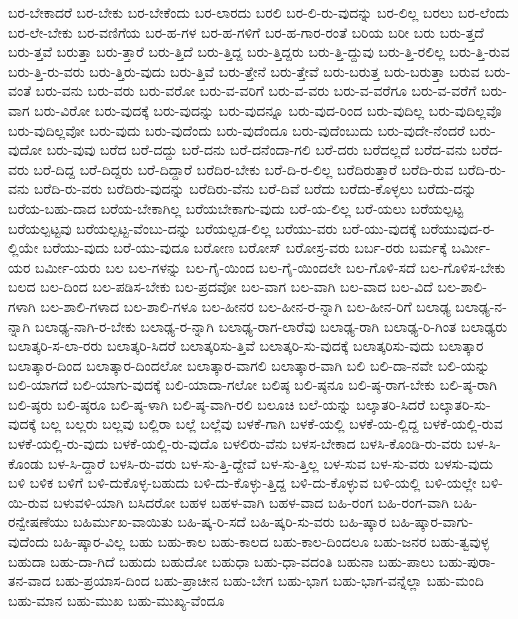 {ಬರ-ಬೇಕಾದರೆ
ಬರ-ಬೇಕು
ಬರ-ಬೇಕೆಂದು
ಬರ-ಲಾರದು
ಬರಲಿ
ಬರ-ಲಿ-ರು-ವುದನ್ನು
ಬರ-ಲಿಲ್ಲ
ಬರಲು
ಬರ-ಲೆಂದು
ಬರ-ಲೇ-ಬೇಕು
ಬರ-ವಣಿಗೆಯ
ಬರ-ಹ-ಗಳ
ಬರ-ಹ-ಗಳಿಗೆ
ಬರ-ಹ-ಗಾರ-ರಂತೆ
ಬರಿಯ
ಬರೀ
ಬರು
ಬರು-ತ್ತದೆ
ಬರು-ತ್ತವೆ
ಬರುತ್ತಾ
ಬರು-ತ್ತಾರೆ
ಬರು-ತ್ತಿದೆ
ಬರು-ತ್ತಿದ್ದ
ಬರು-ತ್ತಿದ್ದರು
ಬರು-ತ್ತಿ-ದ್ದುವು
ಬರು-ತ್ತಿ-ರಲಿಲ್ಲ
ಬರು-ತ್ತಿ-ರುವ
ಬರು-ತ್ತಿ-ರು-ವರು
ಬರು-ತ್ತಿರು-ವುದು
ಬರು-ತ್ತಿವೆ
ಬರು-ತ್ತೇನೆ
ಬರು-ತ್ತೇವೆ
ಬರು-ಬರುತ್ತ
ಬರು-ಬರುತ್ತಾ
ಬರುವ
ಬರು-ವಂತೆ
ಬರು-ವನು
ಬರು-ವರು
ಬರು-ವರೋ
ಬರು-ವ-ವರಿಗೆ
ಬರು-ವ-ವರು
ಬರು-ವ-ವರೆಗೂ
ಬರು-ವ-ವರೆಗೆ
ಬರು-ವಾಗ
ಬರು-ವಿರೋ
ಬರು-ವುದಕ್ಕೆ
ಬರು-ವುದನ್ನು
ಬರು-ವುದನ್ನೂ
ಬರು-ವುದ-ರಿಂದ
ಬರು-ವುದಿಲ್ಲ
ಬರು-ವುದಿಲ್ಲವೊ
ಬರು-ವುದಿಲ್ಲವೋ
ಬರು-ವುದು
ಬರು-ವುದೆಂದು
ಬರು-ವುದೆಂದೂ
ಬರು-ವುದೆಂಬುದು
ಬರು-ವುದೇ-ನೆಂದರೆ
ಬರು-ವುದೋ
ಬರು-ವುವು
ಬರೆದ
ಬರೆ-ದದ್ದು
ಬರೆ-ದನು
ಬರೆ-ದನೆಂದಾ-ಗಲಿ
ಬರೆ-ದರು
ಬರೆದಲ್ಲದೆ
ಬರೆದ-ವನು
ಬರೆದ-ವರು
ಬರೆ-ದಿದ್ದ
ಬರೆ-ದಿದ್ದರು
ಬರೆ-ದಿದ್ದಾರೆ
ಬರೆದಿರ-ಬೇಕು
ಬರೆ-ದಿ-ರ-ಲಿಲ್ಲ
ಬರೆದಿರುತ್ತಾರೆ
ಬರೆದಿ-ರುವ
ಬರೆದಿ-ರು-ವನು
ಬರೆದಿ-ರು-ವರು
ಬರೆದಿರು-ವುದನ್ನು
ಬರೆದಿರು-ವೆನು
ಬರೆ-ದಿವೆ
ಬರೆದು
ಬರೆದು-ಕೊಳ್ಳಲು
ಬರೆದು-ದನ್ನು
ಬರೆಯ-ಬಹು-ದಾದ
ಬರೆಯ-ಬೇಕಾಗಿಲ್ಲ
ಬರೆಯಬೇಕಾಗು-ವುದು
ಬರೆ-ಯ-ಲಿಲ್ಲ
ಬರೆ-ಯಲು
ಬರೆಯಲ್ಪಟ್ಟ
ಬರೆಯಲ್ಪಟ್ಟವು
ಬರೆಯಲ್ಪಟ್ಟ-ವೆಂಬು-ದನ್ನು
ಬರೆಯಲ್ಪಡ-ಲಿಲ್ಲ
ಬರೆಯು-ವರು
ಬರೆ-ಯು-ವುದಕ್ಕೆ
ಬರೆಯುವುದ-ರ-ಲ್ಲಿಯೇ
ಬರೆಯು-ವುದು
ಬರೆ-ಯು-ವುದೂ
ಬರೋಣ
ಬರೋಸ್
ಬರೋಸ್ರ-ವರು
ಬರ್ಬ-ರರು
ಬರ್ಮಕ್ಕೆ
ಬರ್ಮೀ-ಯರ
ಬರ್ಮೀ-ಯರು
ಬಲ
ಬಲ-ಗಳನ್ನು
ಬಲ-ಗೈ-ಯಿಂದ
ಬಲ-ಗೈ-ಯಿಂದಲೇ
ಬಲ-ಗೊಳಿ-ಸದೆ
ಬಲ-ಗೊಳಿಸ-ಬೇಕು
ಬಲದ
ಬಲ-ದಿಂದ
ಬಲ-ಪಡಿಸ-ಬೇಕು
ಬಲ-ಪ್ರದವೋ
ಬಲ-ವಾಗ
ಬಲ-ವಾಗಿ
ಬಲ-ವಾದ
ಬಲ-ವಿದೆ
ಬಲ-ಶಾಲಿ-ಗಳಾಗಿ
ಬಲ-ಶಾಲಿ-ಗಳಾದ
ಬಲ-ಶಾಲಿ-ಗಳೂ
ಬಲ-ಹೀನರ
ಬಲ-ಹೀನ-ರ-ನ್ನಾಗಿ
ಬಲ-ಹೀನ-ರಿಗೆ
ಬಲಾಢ್ಯ
ಬಲಾಢ್ಯ-ನ-ನ್ನಾಗಿ
ಬಲಾಢ್ಯ-ನಾಗಿ-ರ-ಬೇಕು
ಬಲಾಢ್ಯ-ರ-ನ್ನಾಗಿ
ಬಲಾಢ್ಯ-ರಾಗ-ಲಾರೆವು
ಬಲಾಢ್ಯ-ರಾಗಿ
ಬಲಾಢ್ಯ-ರಿ-ಗಿಂತ
ಬಲಾಢ್ಯರು
ಬಲಾತ್ಕರಿ-ಸ-ಲಾ-ರರು
ಬಲಾತ್ಕರಿ-ಸಿದರೆ
ಬಲಾತ್ಕರಿಸು-ತ್ತಿವೆ
ಬಲಾತ್ಕರಿ-ಸು-ವುದಕ್ಕೆ
ಬಲಾತ್ಕರಿಸು-ವುದು
ಬಲಾತ್ಕಾರ
ಬಲಾತ್ಕಾರ-ದಿಂದ
ಬಲಾತ್ಕಾರ-ದಿಂದಲೋ
ಬಲಾತ್ಕಾರ-ವಾಗಲಿ
ಬಲಾತ್ಕಾರ-ವಾಗಿ
ಬಲಿ
ಬಲಿ-ದಾ-ನವೇ
ಬಲಿ-ಯನ್ನು
ಬಲಿ-ಯಾಗದೆ
ಬಲಿ-ಯಾಗು-ವುದಕ್ಕೆ
ಬಲಿ-ಯಾದಾ-ಗಲೋ
ಬಲಿಷ್ಠ
ಬಲಿ-ಷ್ಠನೂ
ಬಲಿ-ಷ್ಠ-ರಾಗ-ಬೇಕು
ಬಲಿ-ಷ್ಠ-ರಾಗಿ
ಬಲಿ-ಷ್ಠರು
ಬಲಿ-ಷ್ಠರೂ
ಬಲಿ-ಷ್ಠ-ಳಾಗಿ
ಬಲಿ-ಷ್ಠ-ವಾಗಿ-ರಲಿ
ಬಲೂಚಿ
ಬಲೆ-ಯನ್ನು
ಬಲ್ಕಾತರಿ-ಸಿದರೆ
ಬಲ್ಕಾತರಿ-ಸು-ವುದಕ್ಕೆ
ಬಲ್ಲ
ಬಲ್ಲರು
ಬಲ್ಲವು
ಬಲ್ಲಿರಾ
ಬಲ್ಲೆ
ಬಲ್ಲೆವು
ಬಳಕೆ-ಗಾಗಿ
ಬಳಕೆ-ಯಲ್ಲಿ
ಬಳಕೆ-ಯ-ಲ್ಲಿದ್ದ
ಬಳಕೆ-ಯಲ್ಲಿ-ರುವ
ಬಳಕೆ-ಯಲ್ಲಿ-ರು-ವುದು
ಬಳಕೆ-ಯಲ್ಲಿ-ರು-ವುದೊ
ಬಳಲಿರು-ವೆನು
ಬಳಸ-ಬೇಕಾದ
ಬಳಸಿ-ಕೊಂಡಿ-ರು-ವರು
ಬಳ-ಸಿ-ಕೊಂಡು
ಬಳ-ಸಿ-ದ್ದಾರೆ
ಬಳಸಿ-ರು-ವರು
ಬಳ-ಸು-ತ್ತಿ-ದ್ದೇವೆ
ಬಳ-ಸು-ತ್ತಿಲ್ಲ
ಬಳ-ಸುವ
ಬಳ-ಸು-ವರು
ಬಳಸು-ವುದು
ಬಳಿ
ಬಳಿಕ
ಬಳಿಗೆ
ಬಳಿ-ದುಕೊಳ್ಳ-ಬಹುದು
ಬಳಿ-ದು-ಕೊಳ್ಳು-ತ್ತಿದ್ದ
ಬಳಿ-ದು-ಕೊಳ್ಳುವ
ಬಳಿ-ಯಲ್ಲಿ
ಬಳಿ-ಯಲ್ಲೇ
ಬಳಿ-ಯಿ-ರುವ
ಬಳುವಳಿ-ಯಾಗಿ
ಬಸಿದರೋ
ಬಹಳ
ಬಹಳ-ವಾಗಿ
ಬಹಳ-ವಾದ
ಬಹಿ-ರಂಗ
ಬಹಿ-ರಂಗ-ವಾಗಿ
ಬಹಿ-ರನ್ವೇಷಣೆಯು
ಬಹಿರ್ಮುಖ-ವಾಯಿತು
ಬಹಿ-ಷ್ಕ-ರಿ-ಸದೆ
ಬಹಿ-ಷ್ಕರಿ-ಸು-ವರು
ಬಹಿ-ಷ್ಕಾರ
ಬಹಿ-ಷ್ಕಾರ-ವಾಗು-ವುದೆಂದು
ಬಹಿ-ಷ್ಕಾರ-ವಿಲ್ಲ
ಬಹು
ಬಹು-ಕಾಲ
ಬಹು-ಕಾಲದ
ಬಹು-ಕಾಲ-ದಿಂದಲೂ
ಬಹು-ಜನರ
ಬಹು-ತ್ವವುಳ್ಳ
ಬಹುದಾ
ಬಹು-ದಾ-ಗಿದೆ
ಬಹುದು
ಬಹುದೋ
ಬಹುಧಾ
ಬಹು-ಧಾ-ವದಂತಿ
ಬಹುನಾ
ಬಹು-ಪಾಲು
ಬಹು-ಪುರಾ-ತನ-ವಾದ
ಬಹು-ಪ್ರಯಾಸ-ದಿಂದ
ಬಹು-ಪ್ರಾಚೀನ
ಬಹು-ಬೇಗ
ಬಹು-ಭಾಗ
ಬಹು-ಭಾಗ-ವನ್ನೆಲ್ಲಾ
ಬಹು-ಮಂದಿ
ಬಹು-ಮಾನ
ಬಹು-ಮುಖ
ಬಹು-ಮುಖ್ಯ-ವೆಂದೂ
}
